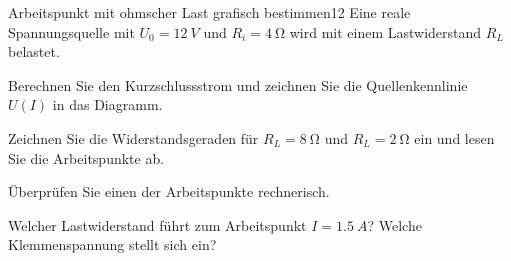 \documentclass[11pt,a4paper]{article}
\begin{document}
\begin{aufgabe}{Arbeitspunkt mit ohmscher Last grafisch bestimmen}{12}
Eine reale Spannungsquelle mit $U_0 = \SI{12}{V}$ und $R_i = \SI{4}{\ohm}$ wird mit einem Lastwiderstand $R_L$ belastet.
\begin{teilaufgaben}
  \item Berechnen Sie den Kurzschlussstrom und zeichnen Sie die Quellenkennlinie $U(I)$ in das Diagramm.
  \item Zeichnen Sie die Widerstandsgeraden für $R_L = \SI{8}{\ohm}$ und $R_L = \SI{2}{\ohm}$ ein und lesen Sie die Arbeitspunkte ab.
  \item Überprüfen Sie einen der Arbeitspunkte rechnerisch.
  \item Welcher Lastwiderstand führt zum Arbeitspunkt $I = \SI{1.5}{A}$? Welche Klemmenspannung stellt sich ein?
\end{teilaufgaben}
\begin{center}
\end{center}
\end{aufgabe}
\end{document}
